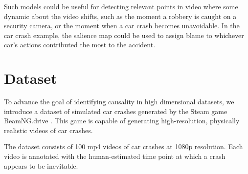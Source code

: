 \documentclass[letterpaper, twocolumn]{article} %
\begin{document}
Such models could be useful for detecting relevant points in video where some dynamic about the video shifts, such as the moment a robbery is caught on a security camera, or the moment when a car crash becomes unavoidable. In the car crash example, the salience map could be used to assign blame to whichever car's actions contributed the most to the accident.


\section{Dataset}

To advance the goal of identifying causality in high dimensional datasets, we introduce a dataset of simulated car crashes generated by the Steam game BeamNG.drive \cite{beamng}. This game is capable of generating high-resolution, physically realistic videos of car crashes.

The dataset consists of 100 mp4 videos of car crashes at 1080p resolution. Each video is annotated with the human-estimated time point at which a crash appears to be inevitable. %
\end{document}
